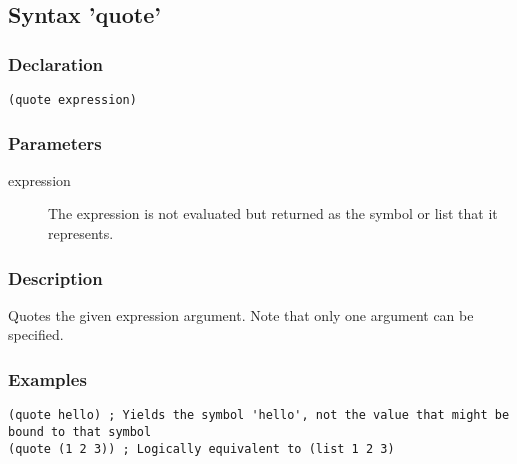 \subsection{Syntax 'quote'}
\label{builtins/quote}

\subsubsection*{Declaration}
\begin{lstlisting}
(quote expression)
\end{lstlisting}

\subsubsection*{Parameters}
\begin{description}
	\item[expression] The expression is not evaluated but returned as the symbol or list that it represents.
\end{description}

\subsubsection*{Description}
Quotes the given expression argument. Note that only one argument can be specified.

\subsubsection*{Examples}
\begin{lstlisting}
(quote hello) ; Yields the symbol 'hello', not the value that might be bound to that symbol
(quote (1 2 3)) ; Logically equivalent to (list 1 2 3)
\end{lstlisting}
